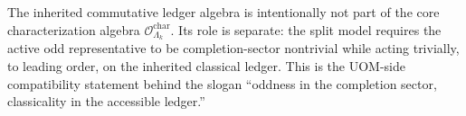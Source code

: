 \documentclass[11pt]{article}
\begin{document}
\begin{remark}
\label{rem:ledger-compat}
The inherited commutative ledger algebra is intentionally not part of the core characterization
algebra \(\mathcal O^{\mathrm{char}}_{\Lambda_k}\).
Its role is separate: the split model requires the active odd representative to be completion-sector
nontrivial while acting trivially, to leading order, on the inherited classical ledger.
This is the UOM-side compatibility statement behind the slogan
``oddness in the completion sector, classicality in the accessible ledger.''
\end{remark}

\ifdefined\UOMTransportFragmentLoaded\else
\end{document}

